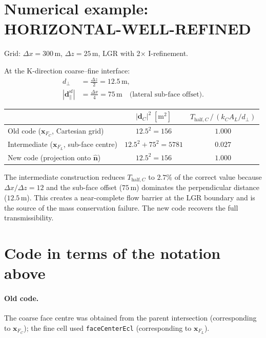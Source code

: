 \documentclass[11pt,a4paper]{article}
\begin{document}
\section{Numerical example: HORIZONTAL-WELL-REFINED}
\label{sec:numbers}

Grid: $\Delta x = 300\,\text{m}$, $\Delta z = 25\,\text{m}$,
LGR with 2$\times$ I-refinement.

At the K-direction coarse--fine interface:
\begin{align*}
  d_\perp &= \tfrac{\Delta z}{2} = 12.5\,\text{m},\\
  |\mathbf{d}_\parallel^{\text{sf}}|
          &= \tfrac{\Delta x}{4} = 75\,\text{m}
           \quad\text{(lateral sub-face offset)}.
\end{align*}

\begin{center}
\begin{tabular}{lcc}
\toprule
 & $|\mathbf{d}_C|^2\;[\text{m}^2]$
 & $T_{\text{half},C}\,/\,(k_C A_L / d_\perp)$ \\
\midrule
Old code ($\mathbf{x}_{F_C}$, Cartesian grid)
  & $12.5^2 = 156$   & $1.000$ \\
Intermediate ($\mathbf{x}_{F_L}$, sub-face centre)
  & $12.5^2+75^2 = 5781$ & $0.027$ \\
New code (projection onto $\hat{\mathbf{n}}$)
  & $12.5^2 = 156$   & $1.000$ \\
\bottomrule
\end{tabular}
\end{center}

\medskip\noindent
The intermediate construction reduces $T_{\text{half},C}$ to $2.7\%$ of
the correct value because $\Delta x/\Delta z = 12$ and the sub-face
offset ($75\,\text{m}$) dominates the perpendicular distance
($12.5\,\text{m}$).  This creates a near-complete flow barrier at the
LGR boundary and is the source of the mass conservation failure.  The
new code recovers the full transmissibility.

\section{Code in terms of the notation above}

\paragraph{Old code.}
The coarse face centre was obtained from the parent intersection
(corresponding to $\mathbf{x}_{F_C}$); the fine cell used
\texttt{faceCenterEcl} (corresponding to $\mathbf{x}_{F_L}$).
\end{document}

